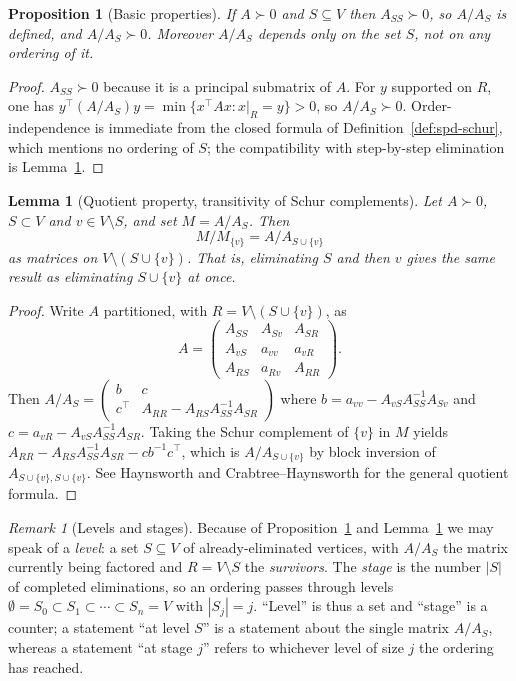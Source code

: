 \documentclass[11pt]{article}
\theoremstyle{plain}
\newtheorem{lemma}[theorem]{Lemma}
\newtheorem{proposition}[theorem]{Proposition}
\theoremstyle{definition}
\theoremstyle{remark}
\newtheorem{remark}[theorem]{Remark}
\begin{document}
\begin{humanaiblock}
\begin{proposition}[Basic properties]\label{prop:schur-basic}
If $A\succ0$ and $S\subseteq V$ then $A_{SS}\succ0$, so $A/A_S$ is defined, and $A/A_S\succ0$.
Moreover $A/A_S$ depends only on the \emph{set} $S$, not on any ordering of it.
\end{proposition}
\begin{proof}
$A_{SS}\succ0$ because it is a principal submatrix of $A$. For $y$ supported on $R$, one has
$y^\top(A/A_S)y=\min\{x^\top Ax : x|_R=y\}>0$, so $A/A_S\succ0$. Order-independence is immediate from
the closed formula of Definition~\ref{def:spd-schur}, which mentions no ordering of $S$; the
compatibility with step-by-step elimination is Lemma~\ref{lem:quotient}.
\end{proof}

\begin{lemma}[Quotient property, transitivity of Schur complements]\label{lem:quotient}
Let $A\succ0$, $S\subset V$ and $v\in V\setminus S$, and set $M=A/A_S$. Then
\[
M/M_{\{v\}} = A/A_{S\cup\{v\}}
\]
as matrices on $V\setminus(S\cup\{v\})$. That is, eliminating $S$ and then $v$ gives the same result
as eliminating $S\cup\{v\}$ at once.
\end{lemma}
\begin{proof}
Write $A$ partitioned, with $R=V\setminus(S\cup\{v\})$, as
\[
A=\begin{pmatrix}A_{SS}&A_{Sv}&A_{SR}\\A_{vS}&a_{vv}&a_{vR}\\A_{RS}&a_{Rv}&A_{RR}\end{pmatrix}.
\]
Then $A/A_S=\begin{pmatrix}b&c\\c^\top&A_{RR}-A_{RS}A_{SS}^{-1}A_{SR}\end{pmatrix}$ where
$b=a_{vv}-A_{vS}A_{SS}^{-1}A_{Sv}$ and $c=a_{vR}-A_{vS}A_{SS}^{-1}A_{SR}$. Taking the Schur
complement of $\{v\}$ in $M$ yields $A_{RR}-A_{RS}A_{SS}^{-1}A_{SR}-cb^{-1}c^\top$, which is
$A/A_{S\cup\{v\}}$ by block inversion of $A_{S\cup\{v\},S\cup\{v\}}$. See Haynsworth
\cite{Haynsworth} and Crabtree--Haynsworth \cite{Crabtree} for the general quotient formula.
\end{proof}

\begin{remark}[Levels and stages]\label{rem:level-stage}
Because of Proposition~\ref{prop:schur-basic} and Lemma~\ref{lem:quotient} we may speak of a
\emph{level}: a set $S\subseteq V$ of already-eliminated vertices, with $A/A_S$ the matrix currently
being factored and $R=V\setminus S$ the \emph{survivors}. The \emph{stage} is the number $|S|$ of
completed eliminations, so an ordering passes through levels
$\emptyset=S_0\subset S_1\subset\cdots\subset S_n=V$ with $|S_j|=j$. ``Level'' is thus a set and
``stage'' is a counter; a statement ``at level $S$'' is a statement about the single matrix $A/A_S$,
whereas a statement ``at stage $j$'' refers to whichever level of size $j$ the ordering has reached.
\end{remark}


\end{humanaiblock}
\end{document}
